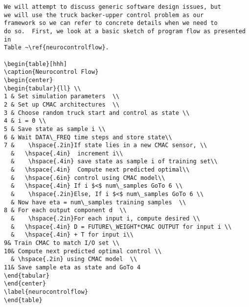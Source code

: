 \documentclass[11pt]{SelfArxOneColBMN}
\begin{document}
\singlespacing 
{}
\begin{lstlisting}
We will attempt to discuss generic software design issues, but
we will use the truck backer-upper control problem as our
framework so we can refer to concrete details when we need to 
do so.  First, we look at a basic sketch of program flow as presented in
Table ~\ref{neurocontrolflow}.  
 
\begin{table}[hhh]
\caption{Neurocontrol Flow}
\begin{center}
\begin{tabular}{ll} \\
1 & Set simulation parameters  \\
2 & Set up CMAC architectures  \\
3 & Choose random truck start and control as state \\
4 & i = 0 \\
5 & Save state as sample i \\
6 & Wait DATA\_FREQ time steps and store state\\
7 &    \hspace{.2in}If state lies in a new CMAC sensor, \\
  &   \hspace{.4in}  increment i\\
  &    \hspace{.4in} save state as sample i of training set\\
  &   \hspace{.4in}  Compute next predicted optimal\\
  &   \hspace{.6in} control using CMAC model\\
  &   \hspace{.4in} If i $<$ num\_samples GoTo 6 \\
  &    \hspace{.2in}Else, If i $<$ num\_samples GoTo 6 \\
  & Now have eta = num\_samples training samples  \\
8 & For each output component d  \\
  &    \hspace{.2in}For each input i, compute desired \\
  &   \hspace{.4in} D = FUTURE\_WEIGHT*CMAC OUTPUT for input i \\
  &   \hspace{.4in} + T for input i\\
9& Train CMAC to match I/O set \\
10& Compute next predicted optimal control \\
  & \hspace{.2in} using CMAC model  \\
11& Save sample eta as state and GoTo 4
\end{tabular}
\end{center}
\label{neurocontrolflow}
\end{table}
\end{lstlisting}
\onehalfspacing
\lstset{fancyvrb=false}
\end{document}
